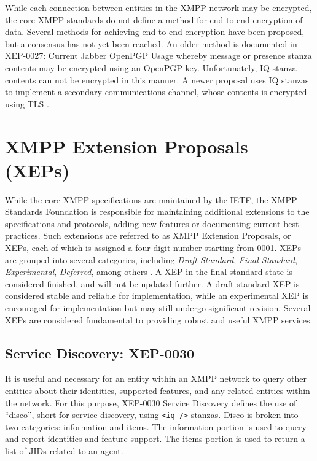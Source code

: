While each connection between entities in the XMPP network may be encrypted,
the core XMPP standards do not define a method for end-to-end encryption of
data. Several methods for achieving end-to-end encryption have been proposed,
but a consensus has not yet been reached. An older method is documented in
XEP-0027: Current Jabber OpenPGP Usage \cite{XEP-0027} whereby message or
presence stanza contents may be encrypted using an OpenPGP key. Unfortunately,
IQ stanza contents can not be encrypted in this manner. A newer proposal uses
IQ stanzas to implement a secondary communications channel, whose contents is
encrypted using TLS \cite{XMPP-E2E}.

\section{XMPP Extension Proposals (XEPs)}
\label{sec:XEPs}

While the core XMPP specifications are maintained by the IETF, the XMPP
Standards Foundation is responsible for maintaining additional extensions to
the specifications and protocols, adding new features or documenting current
best practices. Such extensions are referred to as XMPP Extension Proposals,
or XEPs, each of which is assigned a four digit number starting from 0001.
XEPs are grouped into several categories, including \textit{Draft Standard},
\textit{Final Standard}, \textit{Experimental}, \textit{Deferred}, among others
\cite{XEP-0001}. A XEP in the final standard state is considered finished,
and will not be updated further. A draft standard XEP is considered stable
and reliable for implementation, while an experimental XEP is encouraged for
implementation but may still undergo significant revision. Several XEPs are
considered fundamental to providing robust and useful XMPP services.

\subsection{Service Discovery: XEP-0030}
\label{sec:Service-Discovery}

It is useful and necessary for an entity within an XMPP network to query other
entities about their identities, supported features, and any related entities
within the network. For this purpose, XEP-0030 Service Discovery \cite{XEP-0030}
defines the use of ``disco'', short for service discovery, using \texttt{<iq
/>} stanzas. Disco is broken into two categories: information and items. The
information portion is used to query and report identities and feature support.
The items portion is used to return a list of JIDs related to an agent.

